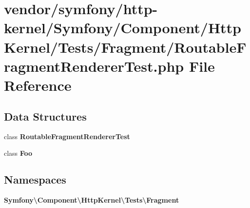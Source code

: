 \section{vendor/symfony/http-\/kernel/\+Symfony/\+Component/\+Http\+Kernel/\+Tests/\+Fragment/\+Routable\+Fragment\+Renderer\+Test.php File Reference}
\label{_routable_fragment_renderer_test_8php}
\subsection*{Data Structures}
\begin{DoxyCompactItemize}
\item 
class {\bf Routable\+Fragment\+Renderer\+Test}
\item 
class {\bf Foo}
\end{DoxyCompactItemize}
\subsection*{Namespaces}
\begin{DoxyCompactItemize}
\item 
 {\bf Symfony\textbackslash{}\+Component\textbackslash{}\+Http\+Kernel\textbackslash{}\+Tests\textbackslash{}\+Fragment}
\end{DoxyCompactItemize}
